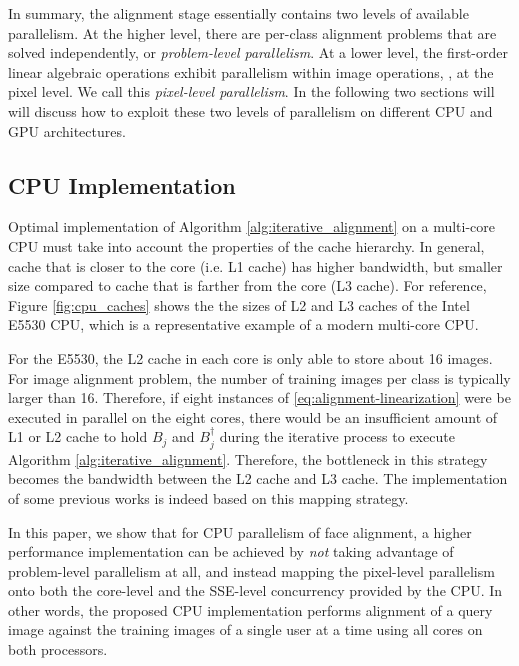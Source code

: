 \documentclass[10pt,twocolumn,letterpaper]{article}
\begin{document}
In summary, the alignment stage essentially contains two levels of available
parallelism. At the higher level, there are per-class alignment problems
that are solved independently, or \emph{problem-level parallelism}.  At a lower
level, the first-order linear algebraic operations exhibit parallelism within
image operations, \ie, at the pixel level.  We call this \emph{pixel-level
parallelism}.  In the following two sections will will discuss how to
exploit these two levels of parallelism on different CPU and GPU architectures.

\subsection{CPU Implementation} 
\label{sec:alignment_implementation_cpu}

Optimal implementation of Algorithm \ref{alg:iterative_alignment} on a multi-core CPU must take 
into account the properties of the cache hierarchy. In general, cache that is 
closer to the core (i.e. L1 cache) has higher bandwidth, but smaller size compared to cache
that is farther from the core (L3 cache).  For reference, Figure \ref{fig:cpu_caches} 
shows the the sizes of L2 and L3 caches of the Intel E5530 CPU, 
which is a representative example of a modern multi-core CPU. 

For the E5530, the L2 cache in each core is only able to store about 16 images.
For image alignment problem, the number of training images per class is
typically larger than 16.  Therefore, if eight instances of
\eqref{eq:alignment-linearization} were be executed in parallel on the eight
cores, there would be an insufficient amount of L1 or L2 cache to hold $B_j$ and
$B_j^\dagger$ during the iterative process to execute Algorithm
\ref{alg:iterative_alignment}. Therefore, the bottleneck in this strategy becomes the
bandwidth between the L2 cache and L3 cache. The implementation of some
previous works \cite{WagnerA2009-CVPR,WagnerA2011-PAMI} is indeed based on this
mapping strategy.

In this paper, we show that for CPU parallelism of face alignment, a higher
performance implementation can be achieved by {\em not} taking advantage of
problem-level parallelism at all, and instead mapping the pixel-level parallelism
onto both the core-level and the SSE-level concurrency provided by the CPU.  In
other words, the proposed CPU implementation performs alignment of a query
image against the training images of a single user at a time using all cores on
both processors.
\end{document}
